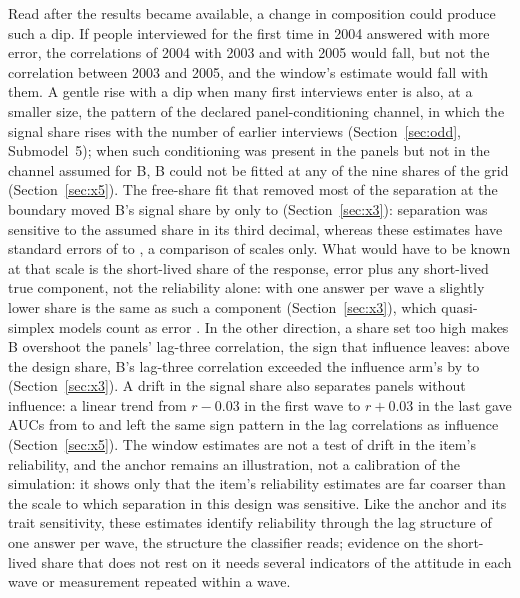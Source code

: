 Read after the results became available, a change in composition could produce such a dip. If people interviewed for the first time in 2004 answered with more error, the correlations of 2004 with 2003 and with 2005 would fall, but not the correlation between 2003 and 2005, and the window's estimate would fall with them. A gentle rise with a dip when many first interviews enter is also, at a smaller size, the pattern of the declared panel-conditioning channel, in which the signal share rises with the number of earlier interviews (Section~\ref{sec:odd}, Submodel~5); when such conditioning was present in the panels but not in the channel assumed for B, B could not be fitted at any of the nine shares of the grid (Section~\ref{sec:x5}). The free-share fit that removed most of the separation at the boundary moved B's signal share by only  to  (Section~\ref{sec:x3}): separation was sensitive to the assumed share in its third decimal, whereas these estimates have standard errors of  to , a comparison of scales only. What would have to be known at that scale is the short-lived share of the response, error plus any short-lived true component, not the reliability alone: with one answer per wave a slightly lower share is the same as such a component (Section~\ref{sec:x3}), which quasi-simplex models count as error \cite[p.~183]{saris2014}. In the other direction, a share set too high makes B overshoot the panels' lag-three correlation, the sign that influence leaves:  above the design share, B's lag-three correlation exceeded the influence arm's by  to  (Section~\ref{sec:x3}). A drift in the signal share also separates panels without influence: a linear trend from $r-0.03$ in the first wave to $r+0.03$ in the last gave AUCs from  to  and left the same sign pattern in the lag correlations as influence (Section~\ref{sec:x5}). The window estimates are not a test of drift in the item's reliability, and the anchor remains an illustration, not a calibration of the simulation: it shows only that the item's reliability estimates are far coarser than the scale to which separation in this design was sensitive. Like the anchor and its trait sensitivity, these estimates identify reliability through the lag structure of one answer per wave, the structure the classifier reads; evidence on the short-lived share that does not rest on it needs several indicators of the attitude in each wave or measurement repeated within a wave.

